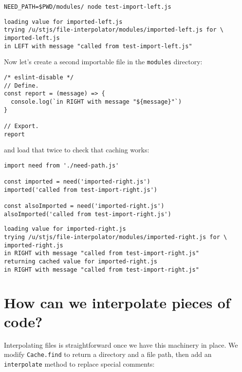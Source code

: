 \documentclass[krantzl]{krantz}
\begin{document}
\begin{lstlisting}[frame=single,frameround=tttt]
NEED_PATH=$PWD/modules/ node test-import-left.js
\end{lstlisting}



\begin{lstlisting}[frame=single,frameround=tttt]
loading value for imported-left.js
trying /u/stjs/file-interpolator/modules/imported-left.js for \
imported-left.js
in LEFT with message "called from test-import-left.js"
\end{lstlisting}



Now let's create a second importable file in the \texttt{modules} directory:


\begin{lstlisting}[frame=single,frameround=tttt]
/* eslint-disable */
// Define.
const report = (message) => {
  console.log(`in RIGHT with message "${message}"`)
}

// Export.
report
\end{lstlisting}



\noindent and load that twice to check that caching works:


\begin{lstlisting}[frame=single,frameround=tttt]
import need from './need-path.js'

const imported = need('imported-right.js')
imported('called from test-import-right.js')

const alsoImported = need('imported-right.js')
alsoImported('called from test-import-right.js')
\end{lstlisting}



\begin{lstlisting}[frame=single,frameround=tttt]
loading value for imported-right.js
trying /u/stjs/file-interpolator/modules/imported-right.js for \
imported-right.js
in RIGHT with message "called from test-import-right.js"
returning cached value for imported-right.js
in RIGHT with message "called from test-import-right.js"
\end{lstlisting}


\section{How can we interpolate pieces of code?}\label{file-interpolator-interpolate}


Interpolating files is straightforward once we have this machinery in place.
We modify \texttt{Cache.find} to return a directory and a file path,
then add an \texttt{interpolate} method to replace special comments:
\end{document}
